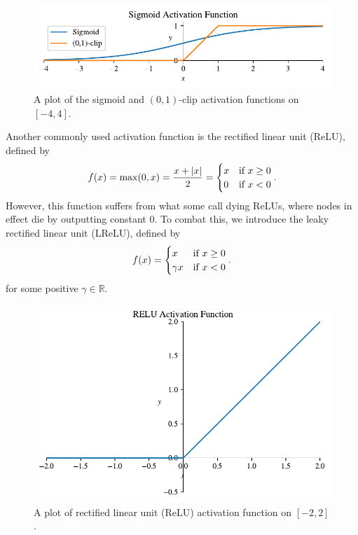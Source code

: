 \documentclass{article}
\theoremstyle{definition}
\begin{document}
\begin{figure}[ht]
    \centering
    \includegraphics[width=.7\textwidth]{activators/sigmoid.pdf}
    \caption{A plot of the sigmoid and $(0,1)$-clip activation functions on $[-4, 4]$.}
    \label{fig:sigmoid}
\end{figure}


Another commonly used activation function is the rectified linear unit (ReLU), defined by
\begin{equation*}
    f(x) = \max(0, x) = \frac{x + |x|}{2} =
    \begin{cases}
        x & \textnormal{if } x \geq 0 \\
        0 & \textnormal{if } x < 0
    \end{cases}.
\end{equation*}
However, this function suffers from what some call dying ReLUs, where nodes in effect die by outputting constant $0$. To combat this, we introduce the leaky rectified linear unit (LReLU), defined by
\begin{equation*}
    f(x) =
    \begin{cases}
        x & \textnormal{if } x \geq 0 \\
        \gamma x & \textnormal{if } x < 0
    \end{cases}.
\end{equation*}
for some positive $\gamma \in \mathbb{R}$. 

\begin{figure}[ht]
    \centering
    \includegraphics[width=.7\textwidth]{activators/RELU.pdf}
    \caption{A plot of rectified linear unit (ReLU) activation function on $[-2, 2]$.}
    \label{fig:RELU}
\end{figure}
\end{document}
